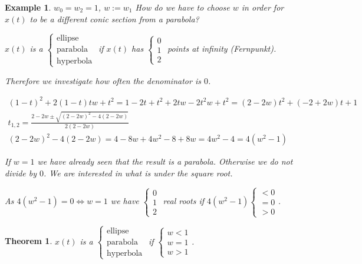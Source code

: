 \documentclass[]{article}
\newtheorem{theorem}{Theorem}
\newtheorem{example}{Example}
\begin{document}
\begin{example}
	$w_0 = w_2 = 1$, $w:=w_1$ How do we have to choose $w$ in order for $x(t)$ to be a different conic section from a parabola?
	
	$x(t)$ is a $\begin{cases}
		\text{ellipse}\\
		\text{parabola}\\
		\text{hyperbola}
	\end{cases}$ if $x(t)$ has $\begin{cases}
	0\\
	1\\
	2
	\end{cases}$ points at infinity (Fernpunkt).
	
	Therefore we investigate how often the denominator is $0$. 
	
	\begin{align*}
		(1-t)^2 + 2(1-t)tw + t^2 = 1 - 2t + t^2 + 2tw - 2t^2w + t^2 = (2-2w)t^2 + (-2+2w)t + 1\\
		t_{1,2} = \frac{2-2w \pm \sqrt{(2-2w)^2 - 4(2-2w)}}{2(2-2w)}\\
		(2-2w)^2 - 4(2-2w) = 4 - 8w + 4w^2 - 8 + 8w = 4w^2 - 4 = 4(w^2 - 1)
	\end{align*}
	
	If $w=1$ we have already seen that the result is a parabola. Otherwise we do not divide by $0$. We are interested in what is under the square root.
	
	As $4(w^2-1) = 0 \iff w=1$ we have $\begin{cases}0\\ 1\\ 2\end{cases}$ real roots if $4(w^2-1) \begin{cases}<0\\ =0\\ >0\end{cases}$.
\end{example}

\begin{theorem}
	$x(t)$ is a $\begin{cases}
		\text{ellipse}\\
		\text{parabola}\\
		\text{hyperbola}
	\end{cases}$ if $\begin{cases}w<1\\ w=1\\ w>1\end{cases}$.
\end{theorem}
\end{document}
